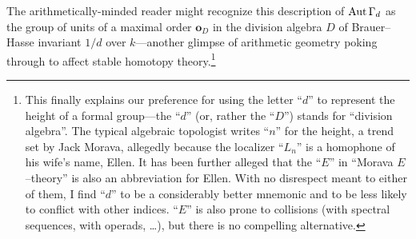 \begin{remark}
The arithmetically-minded reader might recognize this description of \(\operatorname{Aut} \Gamma_d\) as the group of units of a maximal order \(\mathbf o_D\) in the division algebra \(D\) of Brauer--Hasse invariant \(1/d\) over \(k\)---another glimpse of arithmetic geometry poking through to affect stable homotopy theory.\footnote{This finally explains our preference for using the letter ``\(d\)'' to represent the height of a formal group---the ``\(d\)'' (or, rather the ``\(D\)'') stands for ``division algebra''.  The typical algebraic topologist writes ``\(n\)'' for the height, a trend set by Jack Morava, allegedly because the localizer ``\(L_n\)'' is a homophone of his wife's name, Ellen.  It has been further alleged that the ``\(E\)'' in ``Morava \(E\)--theory'' is also an abbreviation for Ellen.  With no disrespect meant to either of them, I find ``\(d\)'' to be a considerably better mnemonic and to be less likely to conflict with other indices.  ``\(E\)'' is also prone to collisions (with spectral sequences, with operads, \ldots), but there is no compelling alternative.}
\end{remark}

